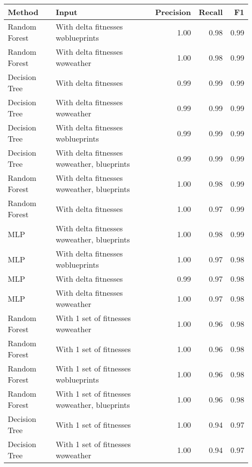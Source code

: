 \begin{tabular}{llrrr}
\toprule
        Method &                                           Input &  Precision &  Recall &   F1 \\
\midrule
 Random Forest &             With delta fitnesses w\o blueprints &       1.00 &    0.98 & 0.99 \\
 Random Forest &                With delta fitnesses w\o weather &       1.00 &    0.98 & 0.99 \\
 Decision Tree &                            With delta fitnesses &       0.99 &    0.99 & 0.99 \\
 Decision Tree &                With delta fitnesses w\o weather &       0.99 &    0.99 & 0.99 \\
 Decision Tree &             With delta fitnesses w\o blueprints &       0.99 &    0.99 & 0.99 \\
 Decision Tree &    With delta fitnesses w\o weather, blueprints &       0.99 &    0.99 & 0.99 \\
 Random Forest &    With delta fitnesses w\o weather, blueprints &       1.00 &    0.98 & 0.99 \\
 Random Forest &                            With delta fitnesses &       1.00 &    0.97 & 0.99 \\
           MLP &    With delta fitnesses w\o weather, blueprints &       1.00 &    0.98 & 0.99 \\
           MLP &             With delta fitnesses w\o blueprints &       1.00 &    0.97 & 0.98 \\
           MLP &                            With delta fitnesses &       0.99 &    0.97 & 0.98 \\
           MLP &                With delta fitnesses w\o weather &       1.00 &    0.97 & 0.98 \\
 Random Forest &             With 1 set of fitnesses w\o weather &       1.00 &    0.96 & 0.98 \\
 Random Forest &                         With 1 set of fitnesses &       1.00 &    0.96 & 0.98 \\
 Random Forest &          With 1 set of fitnesses w\o blueprints &       1.00 &    0.96 & 0.98 \\
 Random Forest & With 1 set of fitnesses w\o weather, blueprints &       1.00 &    0.96 & 0.98 \\
 Decision Tree &                         With 1 set of fitnesses &       1.00 &    0.94 & 0.97 \\
 Decision Tree &             With 1 set of fitnesses w\o weather &       1.00 &    0.94 & 0.97 \\

\end{tabular}
